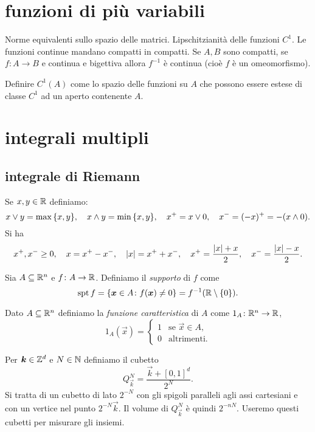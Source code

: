 \chapter{funzioni di più variabili}

Norme equivalenti sullo spazio delle matrici. Lipschitzianità delle funzioni $C^1$.
Le funzioni continue mandano compatti in compatti.
Se $A,B$ sono compatti, se $f\colon A\to B$ e continua e bigettiva allora 
$f^{-1}$ è continua (cioè $f$ è un omeomorfismo).

Definire $C^1(A)$ come lo spazio delle funzioni su $A$ che possono essere 
estese di classe $C^1$ ad un aperto contenente $A$.

\chapter{integrali multipli}

\section{integrale di Riemann}
Se $x,y\in {\mathbb R}$ definiamo:
\[
    x \vee y = \max{\left\{ x,y \right\}},
    \quad
    x \wedge y = \min{\left\{ x,y \right\}},
    \quad
    x^+ = x \vee 0,
    \quad
    x^- = (-x)^+ = -(x\wedge 0).
\]
Si ha
\[
    x^+,x^-\ge 0,
    \quad
    x = x^+ - x^-,
    \quad 
    {\left|x\right|} = x^+ + x^-,
    \quad
    x^+ = \frac{{\left|x\right|}+x}{2},
    \quad
    x^- = \frac{{\left|x\right|}-x}{2}.
\]

Sia $A\subseteq {\mathbb R}^n$ e $f\colon A \to {\mathbb R}$. 
Definiamo il \emph{supporto} di $f$ come 
\[
 \operatorname{spt} f 
    = {\left\{ \boldsymbol x \in A \colon f(\boldsymbol x) \neq 0 \right\}}
    = f^{-1}({\mathbb R}\setminus{\left\{ 0 \right\}}).
\]

Dato $A\subseteq {\mathbb R}^n$ definiamo la \emph{funzione caratteristica}
di $A$ come $1_A\colon {\mathbb R}^n \to {\mathbb R}$,
\[
  1_A(\vec x) = \begin{cases}
    1 & \text{se $\vec x \in A$,}\\
    0 & \text{altrimenti.}
  \end{cases}
\]

Per $\boldsymbol k \in {\mathbb Z}^d$ e $N\in {\mathbb N}$ definiamo 
il cubetto 
\[
  Q^N_{\vec k} = \frac{\vec k + [0,1]^d}{2^N}.
\]
Si tratta di un cubetto di lato $2^{-N}$ con gli spigoli paralleli 
agli assi cartesiani e con un vertice nel punto $2^{-N} \vec k$.
Il volume di $Q^N_{\vec k}$ è quindi $2^{-nN}$.
Useremo questi cubetti per misurare gli insiemi.

